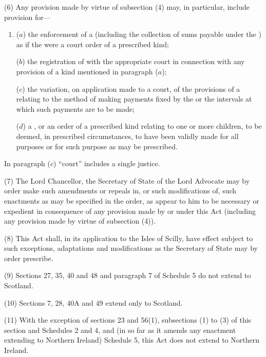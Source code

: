 \documentclass[a4paper]{article}
\begin{document}
(6)
Any provision made by virtue of subsection (4) may, in particular, include provision for---
\begin{enumerate}\item[]
($a$) the enforcement of a  (including the collection of sums payable under the ) as if the  were a court order of a prescribed kind;

($b$) the registration of  with the appropriate court in connection with any provision of a kind mentioned in paragraph ($a$);

($c$) the variation, on application made to a court, of the provisions of a  relating to the method of making payments fixed by the  or the intervals at which such payments are to be made;

($d$) a , or an order of a prescribed kind relating to one or more children, to be deemed, in prescribed circumstances, to have been validly made for all purposes or for such purpose as may be prescribed.
\end{enumerate}

In paragraph ($c$) “court” includes a single justice.

(7)
The Lord Chancellor, the Secretary of State of the Lord Advocate may by order make such amendments or repeals in, or such modifications of, such enactments as may be specified in the order, as appear to him to be necessary or expedient in consequence of any provision made by or under this Act (including any provision made by virtue of subsection (4)).

(8)
This Act shall, in its application to the Isles of Scilly, have effect subject to such exceptions, adaptations and modifications as the Secretary of State may by order prescribe.

(9)
Sections 27, 35, 40 and 48 and paragraph 7 of Schedule 5 do not extend to Scotland.

(10) Sections 7, 28, 40A and 49 extend only to Scotland.

(11)
With the exception of sections 23 and 56(1), subsections (1) to (3) of this section and Schedules 2 and 4, and (in so far as it amends any enactment extending to Northern Ireland) Schedule 5, this Act does not extend to Northern Ireland.
\end{document}
